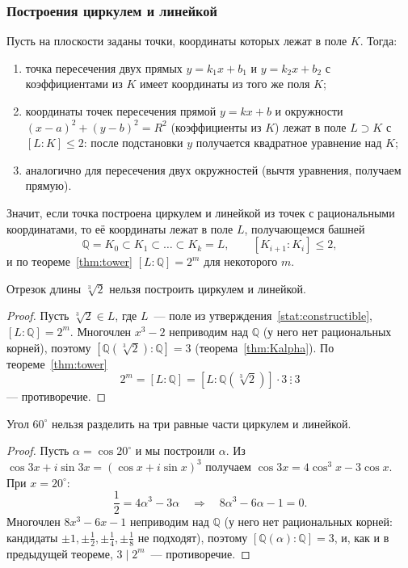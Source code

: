\documentclass[12pt]{article}
\begin{document}
    \subsubsection{Построения циркулем и линейкой}

    \begin{statement}\label{stat:constructible}
    	Пусть на плоскости заданы точки, координаты которых лежат в поле $K$. Тогда:
    	\begin{enumerate}
    		\item точка пересечения двух прямых $y = k_1x + b_1$ и $y = k_2x + b_2$ с коэффициентами из $K$ имеет координаты из того же поля $K$;
    		\item координаты точек пересечения прямой $y = kx + b$ и окружности $(x-a)^2 + (y-b)^2 = R^2$ (коэффициенты из $K$) лежат в поле $L \supset K$ с $[L:K] \leqslant 2$: после подстановки $y$ получается квадратное уравнение над $K$;
    		\item аналогично для пересечения двух окружностей (вычтя уравнения, получаем прямую).
    	\end{enumerate}
    	Значит, если точка построена циркулем и линейкой из точек с рациональными координатами, то её координаты лежат в поле $L$, получающемся башней
    	\[
    		\mathbb{Q} = K_0 \subset K_1 \subset \ldots \subset K_k = L, \qquad [K_{i+1} : K_i] \leqslant 2,
    	\]
    	и по теореме~\ref{thm:tower} $[L:\mathbb{Q}] = 2^m$ для некоторого $m$.
    \end{statement}

    \begin{theorem}
    	Отрезок длины $\sqrt[3]{2}$ нельзя построить циркулем и линейкой.
    \end{theorem}
    \begin{proof}
    	Пусть $\sqrt[3]{2} \in L$, где $L$~--- поле из утверждения~\ref{stat:constructible}, $[L:\mathbb{Q}] = 2^m$. Многочлен $x^3 - 2$ неприводим над $\mathbb{Q}$ (у него нет рациональных корней), поэтому $[\mathbb{Q}(\sqrt[3]{2}):\mathbb{Q}] = 3$ (теорема~\ref{thm:Kalpha}). По теореме~\ref{thm:tower}
    	\[
    		2^m = [L:\mathbb{Q}] = [L:\mathbb{Q}(\sqrt[3]{2})] \cdot 3 \ \vdots \ 3
    	\]
    	--- противоречие.
    \end{proof}

    \begin{theorem}
    	Угол $60^\circ$ нельзя разделить на три равные части циркулем и линейкой.
    \end{theorem}
    \begin{proof}
    	Пусть $\alpha = \cos 20^\circ$ и мы построили $\alpha$. Из $\cos 3x + i\sin 3x = (\cos x + i\sin x)^3$ получаем $\cos 3x = 4\cos^3 x - 3\cos x$. При $x = 20^\circ$:
    	\[
    		\frac{1}{2} = 4\alpha^3 - 3\alpha \quad \Longrightarrow \quad 8\alpha^3 - 6\alpha - 1 = 0.
    	\]
    	Многочлен $8x^3 - 6x - 1$ неприводим над $\mathbb{Q}$ (у него нет рациональных корней: кандидаты $\pm 1, \pm\frac12, \pm\frac14, \pm\frac18$ не подходят), поэтому $[\mathbb{Q}(\alpha):\mathbb{Q}] = 3$, и, как и в предыдущей теореме, $3 \mid 2^m$~--- противоречие.
    \end{proof}
    
\end{document}
